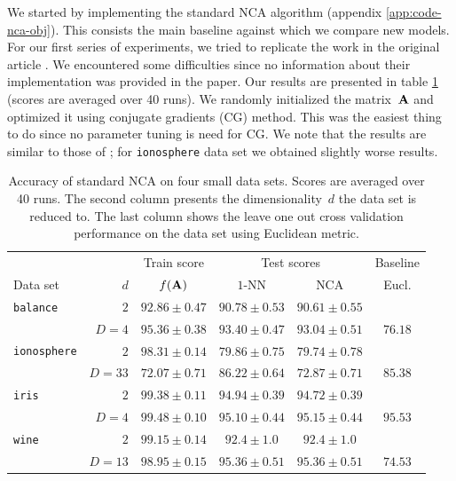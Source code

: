 We started by implementing the standard NCA algorithm (appendix \ref{app:code-nca-obj}). This consists the main baseline against which we compare new models.  
For our first series of experiments, we tried to replicate the work in the original article \citep{goldberger2004}. We encountered some difficulties since no information about their implementation was provided in the paper. Our results are presented in table \ref{table:eval-baseline} (scores are averaged over 40 runs). We randomly initialized the matrix~$\mathbf{A}$ and optimized it using conjugate gradients (CG) method. This was the easiest thing to do since no parameter tuning is need for CG. We note that the results are similar to those of \citet{goldberger2004}; for \texttt{ionosphere} data set we obtained slightly worse results.

\begin{table}
  \centering\begin{tabular}{lrcccc}
  \toprule
	  &     & Train score  & \multicolumn{2}{c}{Test scores} & Baseline \\
  \cmidrule(r){3-3} \cmidrule(r){4-5} \cmidrule(r){6-6}
  Data set & $d$ & $f(\mathbf{A})$ & $1$-NN & NCA & Eucl. \\
  \midrule
    \texttt{balance}&$2$&$92.86 \pm 0.47$&$90.78 \pm 0.53$&$90.61 \pm 0.55$&\\ 
		    &$D=4$&$95.36 \pm 0.38$&$93.40 \pm 0.47$&$93.04 \pm 0.51$&$76.18$\\ 
    \midrule
    \texttt{ionosphere}&$2$&$98.31 \pm 0.14$&$79.86 \pm 0.75$&$79.74 \pm 0.78$&\\ 
		       &$D=33$&$72.07 \pm 0.71$&$86.22 \pm 0.64$&$72.87 \pm 0.71$&$85.38$\\ 
    \midrule
    \texttt{iris}&$2$&$99.38 \pm 0.11$&$94.94 \pm 0.39$&$94.72 \pm 0.39$&\\ 
		 &$D=4$&$99.48 \pm 0.10$&$95.10 \pm 0.44$&$95.15 \pm 0.44$&$95.53$\\
    \midrule
    \texttt{wine}&$2$&$99.15 \pm 0.14$&$92.4 \pm 1.0$&$92.4 \pm 1.0$&\\ 
		 &$D=13$&$98.95 \pm 0.15$&$95.36 \pm 0.51$&$95.36 \pm 0.51$&$74.53$\\ 
  \bottomrule
  \end{tabular}
  \caption{\small Accuracy of standard NCA on four small data sets. Scores are averaged over 40 runs. The second column presents the dimensionality~$d$ the data set is reduced to. The last column shows the leave one out cross validation performance on the data set using Euclidean metric.}
  \label{table:eval-baseline}
\end{table}

